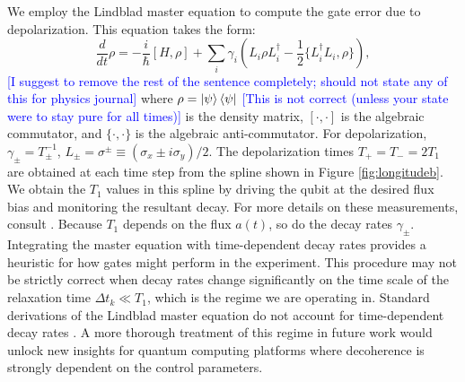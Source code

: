 We employ the Lindblad master equation
to compute the gate error due to depolarization.
This equation takes the form:
\begin{equation}
  \frac{d}{dt} \rho = -\frac{i}{\hbar} [H, \rho]
  + \sum_{i} \gamma_{i} (L_{i} \rho L_{i}^{\dagger}
  - \frac{1}{2} \{L_{i}^{\dagger} L_{i}, \rho\}),
\end{equation}\textcolor{blue}{[I suggest to remove the rest of the sentence completely; should not state any of this for physics journal]}
where $\rho = \ket{\psi}\bra{\psi}$ \textcolor{blue}{[This is not correct (unless your state were to stay pure for all times)]} is the density matrix,
$[\cdot, \cdot]$ is the algebraic commutator, and $\{\cdot, \cdot \}$ is the algebraic
anti-commutator.
For depolarization, $\gamma_{\pm} = T_{\pm}^{-1}$,
$L_{\pm} = \sigma^{\pm} \equiv (\sigma_{x} \pm i \sigma_{y})/2$.
The depolarization times $T_{+} = T_{-} = 2 T_{1}$ are obtained at each time step
from the spline shown in Figure \ref{fig:longitudeb}.
We obtain the $T_{1}$ values in this spline
by driving the qubit at the desired flux bias
and monitoring the resultant decay. For more details
on these measurements, consult \cite{zhang2020universal}.
Because $T_{1}$ depends on the flux $a(t)$, so do
the decay rates $\gamma_{\pm}$.
Integrating the master equation with time-dependent decay rates
provides a heuristic for how gates might  perform in
the experiment. 
This procedure may not be strictly correct
when decay rates change significantly on the time scale of the relaxation time $\Delta t_{k} \ll T_{1}$,
which is the regime we are operating in. Standard
derivations of the Lindblad master equation do not account for
time-dependent decay rates \cite{manzano2020a}. A more thorough
treatment of this regime in future work would unlock new insights for
quantum computing platforms where decoherence is strongly
dependent on the control parameters.

